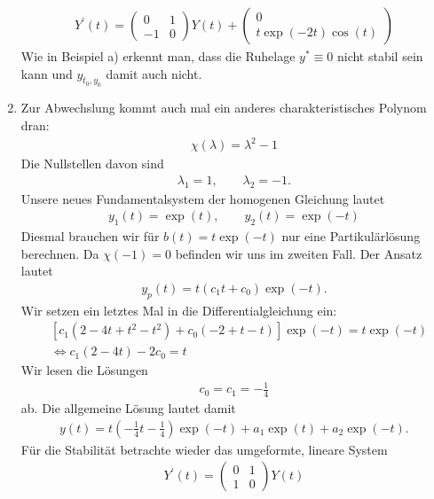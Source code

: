 \begin{solution}
\begin{enumerate}[label = \textbf{\alph*)}]
  \begin{align*}
    Y^{\prime}(t) = \begin{pmatrix}
      0 & 1 \\
      -1 & 0
    \end{pmatrix}Y(t)
    + \begin{pmatrix}
      0 \\ t\exp(-2t)\cos(t)
    \end{pmatrix}
  \end{align*}
  Wie in Beispiel a) erkennt man, dass die Ruhelage $y^* \equiv 0$ nicht stabil sein
  kann und $y_{t_0,y_0}$ damit auch nicht.
  \item Zur Abwechslung kommt auch mal ein anderes charakteristisches Polynom dran:
  \begin{align*}
    \chi(\lambda) = \lambda^2 - 1
  \end{align*}
  Die Nullstellen davon sind
  \begin{align*}
    \lambda_1 = 1, \qquad \lambda_2 = -1.
  \end{align*}
  Unsere neues Fundamentalsystem der homogenen Gleichung lautet
  \begin{align*}
    y_1(t) = \exp(t), \qquad y_2(t) = \exp(-t)
  \end{align*}
  Diesmal brauchen wir für $b(t) = t\exp(-t)$ nur eine Partikulärlösung berechnen.
  Da $\chi(-1) = 0$ befinden wir uns im zweiten Fall. Der Ansatz lautet
  \begin{align*}
    y_p(t) = t(c_1t + c_0)\exp(-t).
  \end{align*}
  Wir setzen ein letztes Mal in die Differentialgleichung ein:
  \begin{align*}
    &[c_1(2 - 4t + t^2 - t^2)+ c_0(-2 + t - t)]\exp(-t) = t\exp(-t) \\
    &\iff c_1(2 - 4t) - 2c_0 = t
  \end{align*}
  Wir lesen die Lösungen
  \begin{align*}
    c_0 = c_1 = -\frac{1}{4}
  \end{align*}
  ab. Die allgemeine Lösung lautet damit
  \begin{align*}
    y(t) = t(-\frac{1}{4}t - \frac{1}{4})\exp(-t) + a_1\exp(t) + a_2\exp(-t).
  \end{align*}
  Für die Stabilität betrachte wieder das umgeformte, lineare System
  \begin{align*}
    Y^{\prime}(t) = \begin{pmatrix}
      0 & 1 \\
      1 & 0
    \end{pmatrix}Y(t)

\end{align*}
\end{enumerate}
\end{solution}

